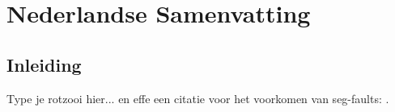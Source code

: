 \chapter*{Nederlandse Samenvatting}
\renewcommand\thesection{\arabic{section}}
\label{chap:NL}

\section{Inleiding}
\label{sec:NLintro}

\par
Type je rotzooi hier... en effe een citatie voor het voorkomen van seg-faults: \cite{Sn132}.
